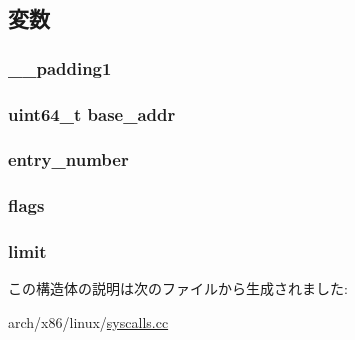 \subsection{変数}
\hypertarget{structUserDesc64_a136aaa05f51583820b3ea29067462b5d}{
\subsubsection[{\_\-\_\-padding1}]{ {\bf \_\-\_\-padding1}}}
\label{structUserDesc64_a136aaa05f51583820b3ea29067462b5d}
\hypertarget{structUserDesc64_a01f23b98a91aec01909d35c79b36ace7}{
\subsubsection[{base\_\-addr}]{\setlength{\rightskip}{0pt plus 5cm}uint64\_\-t {\bf base\_\-addr}}}
\label{structUserDesc64_a01f23b98a91aec01909d35c79b36ace7}
\hypertarget{structUserDesc64_a3853054eadcbb69cc9c8f72b529d672c}{
\subsubsection[{entry\_\-number}]{ {\bf entry\_\-number}}}
\label{structUserDesc64_a3853054eadcbb69cc9c8f72b529d672c}
\hypertarget{structUserDesc64_a773b39d480759f67926cb18ae2219281}{
\subsubsection[{flags}]{ {\bf flags}}}
\label{structUserDesc64_a773b39d480759f67926cb18ae2219281}
\hypertarget{structUserDesc64_a119a08b6fc41ba2bd00760569f3167eb}{
\subsubsection[{limit}]{ {\bf limit}}}
\label{structUserDesc64_a119a08b6fc41ba2bd00760569f3167eb}


この構造体の説明は次のファイルから生成されました:\begin{DoxyCompactItemize}
\item 
arch/x86/linux/\hyperlink{x86_2linux_2syscalls_8cc}{syscalls.cc}\end{DoxyCompactItemize}
